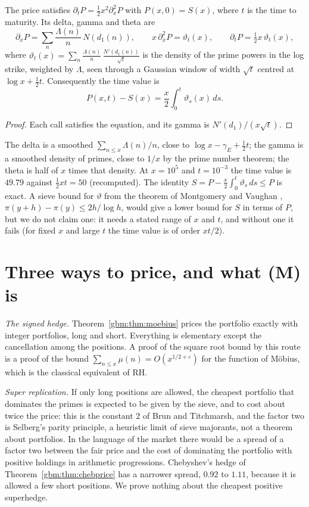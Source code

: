 \begin{theorem}\label{gbm:thm:greeks}
The price satisfies $\partial_tP=\frac12x^2\partial_x^2P$ with $P(x,0)=S(x)$, where $t$ is the time to maturity. Its delta, gamma and theta are
\[
\partial_xP=\sum_n\frac{\Lambda(n)}n\,N(d_1(n)),\qquad x\,\partial_x^2P=\vartheta_t(x),\qquad\partial_tP=\tfrac12x\,\vartheta_t(x),
\]
where $\vartheta_t(x)=\sum_n\frac{\Lambda(n)}n\,\frac{N'(d_1(n))}{\sqrt t}$ is the density of the prime powers in the log strike, weighted by $\Lambda$, seen through a Gaussian window of width $\sqrt t$ centred at $\log x+\frac12t$. Consequently the time value is
\[
P(x,t)-S(x)=\frac x2\int_0^t\vartheta_s(x)\,ds .
\]
\end{theorem}

\begin{proof}
Each call satisfies the equation, and its gamma is $N'(d_1)/(x\sqrt t)$.
\end{proof}

The delta is a smoothed $\sum_{n\le x}\Lambda(n)/n$, close to $\log x-\gamma_E+\frac12t$; the gamma is a smoothed density of primes, close to $1/x$ by the prime number theorem; the theta is half of $x$ times that density. At $x=10^5$ and $t=10^{-3}$ the time value is $49.79$ against $\frac12xt=50$ (recomputed). The identity $S=P-\frac x2\int_0^t\vartheta_s\,ds\le P$ is exact. A sieve bound for $\vartheta$ from the theorem of Montgomery and Vaughan \cite{MV73}, $\pi(y+h)-\pi(y)\le2h/\log h$, would give a lower bound for $S$ in terms of $P$, but we do not claim one: it needs a stated range of $x$ and $t$, and without one it fails (for fixed $x$ and large $t$ the time value is of order $xt/2$).

\section{Three ways to price, and what (M) is}\label{gbm:sec:threeways}

\emph{The signed hedge.} Theorem~\ref{gbm:thm:moebius} prices the portfolio exactly with integer portfolios, long and short. Everything is elementary except the cancellation among the positions. A proof of the square root bound by this route is a proof of the bound $\sum_{n\le x}\mu(n)=O(x^{1/2+\varepsilon})$ for the function of M\"obius, which is the classical equivalent of RH.

\emph{Super replication.} If only long positions are allowed, the cheapest portfolio that dominates the primes is expected to be given by the sieve, and to cost about twice the price: this is the constant $2$ of Brun and Titchmarsh, and the factor two is Selberg's parity principle, a heuristic limit of sieve majorants, not a theorem about portfolios. In the language of the market there would be a spread of a factor two between the fair price and the cost of dominating the portfolio with positive holdings in arithmetic progressions. Chebyshev's hedge of Theorem~\ref{gbm:thm:chebprice} has a narrower spread, $0.92$ to $1.11$, because it is allowed a few short positions. We prove nothing about the cheapest positive superhedge.

